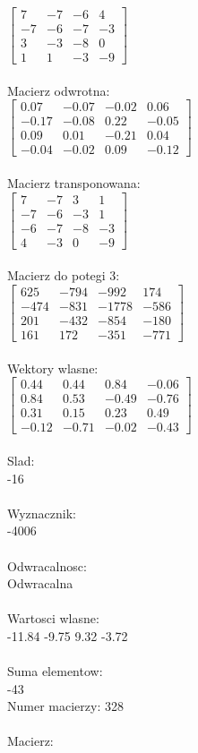 \documentclass[a4paper,12pt]{article}
\begin{document}
$\begin{bmatrix} 7&-7&-6&4\\-7&-6&-7&-3\\3&-3&-8&0\\1&1&-3&-9 \end{bmatrix}$
\\
\\
Macierz odwrotna:\\

$\begin{bmatrix} 0.07&-0.07&-0.02&0.06\\-0.17&-0.08&0.22&-0.05\\0.09&0.01&-0.21&0.04\\-0.04&-0.02&0.09&-0.12 \end{bmatrix}$
\\
\\
Macierz transponowana:\\

$\begin{bmatrix} 7&-7&3&1\\-7&-6&-3&1\\-6&-7&-8&-3\\4&-3&0&-9 \end{bmatrix}$
\\
\\
Macierz do potegi 3:\\

$\begin{bmatrix} 625&-794&-992&174\\-474&-831&-1778&-586\\201&-432&-854&-180\\161&172&-351&-771 \end{bmatrix}$
\\
\\
Wektory wlasne:\\

$\begin{bmatrix} 0.44&0.44&0.84&-0.06\\0.84&0.53&-0.49&-0.76\\0.31&0.15&0.23&0.49\\-0.12&-0.71&-0.02&-0.43 \end{bmatrix}$
\\
\\
Slad:\\
-16
\\
\\
Wyznacznik:\\
-4006
\\
\\
Odwracalnosc:\\
Odwracalna
\\
\\
Wartosci wlasne:\\
-11.84 -9.75 9.32 -3.72
\\
\\
Suma elementow:\\
-43
\\
\newpage
Numer macierzy:
328
\\
\\
Macierz:\\
\end{document}
